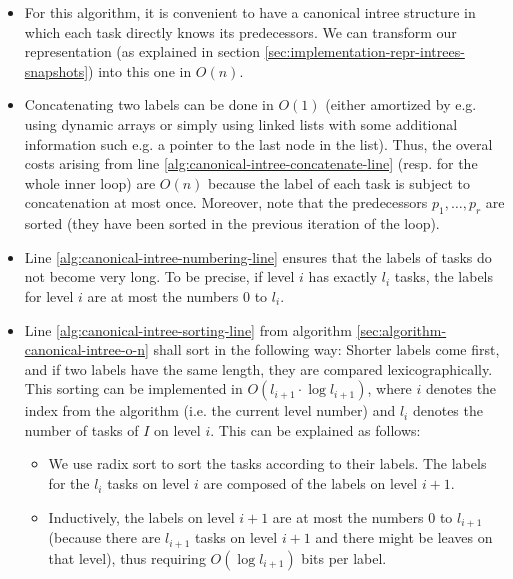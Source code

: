 \begin{itemize}
\item For this algorithm, it is convenient to have a canonical intree structure in which each task directly knows its predecessors. We can transform our representation (as explained in section \ref{sec:implementation-repr-intrees-snapshots}) into this one in $O(n)$.
\item Concatenating two labels can be done in $O(1)$ (either amortized by e.g. using dynamic arrays or simply using linked lists with some additional information such e.g. a pointer to the last node in the list). Thus, the overal costs arising from line \ref{alg:canonical-intree-concatenate-line} (resp. for the whole inner loop) are $O(n)$ because the label of each task is subject to concatenation at most once. Moreover, note that the predecessors $p_1,\dots,p_r$ are sorted (they have been sorted in the previous iteration of the loop).
\item Line \ref{alg:canonical-intree-numbering-line} ensures that the labels of tasks do not become very long. To be precise, if level $i$ has exactly $l_i$ tasks, the labels for level $i$ are at most the numbers 0 to $l_i$.
\item Line \ref{alg:canonical-intree-sorting-line} from algorithm \ref{sec:algorithm-canonical-intree-o-n} shall sort in the following way: Shorter labels come first, and if two labels have the same length, they are compared lexicographically. This sorting can be implemented in $O(l_{i+1}\cdot\log l_{i+1})$, where $i$ denotes the index from the algorithm (i.e. the current level number) and $l_i$ denotes the number of tasks of $I$ on level $i$. This can be explained as follows:
  \begin{itemize}
  \item We use radix sort to sort the tasks according to their labels. The labels for the $l_i$ tasks on level $i$ are composed of the labels on level $i+1$.
  \item Inductively, the labels on level $i+1$ are at most the numbers 0 to $l_{i+1}$ (because there are $l_{i+1}$ tasks on level $i+1$ and there might be leaves on that level), thus requiring $O(\log l_{i+1})$ bits per label.

\end{itemize}
\end{itemize}
